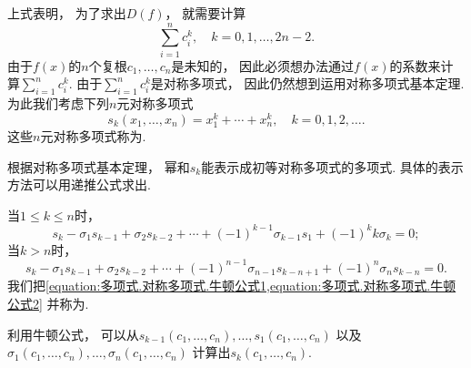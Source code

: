 上式表明，
为了求出\(D(f)\)，
就需要计算\[
	\sum_{i=1}^n c_i^k,
	\quad k=0,1,\dotsc,2n-2.
\]
由于\(f(x)\)的\(n\)个复根\(c_1,\dotsc,c_n\)是未知的，
因此必须想办法通过\(f(x)\)的系数来计算\(\sum_{i=1}^n c_i^k\).
由于\(\sum_{i=1}^n c_i^k\)是对称多项式，
因此仍然想到运用对称多项式基本定理.
为此我们考虑下列\(n\)元对称多项式\[
	s_k(x_1,\dotsc,x_n)
	=x_1^k+\dotsb+x_n^k,
	\quad k=0,1,2,\dotsc.
\]
这些\(n\)元对称多项式称为.

根据对称多项式基本定理，
幂和\(s_k\)能表示成初等对称多项式的多项式.
具体的表示方法可以用递推公式求出.

当\(1\leq k\leq n\)时，
\begin{equation}\label{equation:多项式.对称多项式.牛顿公式1}
	s_k
	- \sigma_1 s_{k-1}
	+ \sigma_2 s_{k-2}
	+ \dotsb
	+ (-1)^{k-1} \sigma_{k-1} s_1
	+ (-1)^k k \sigma_k
	=0;
\end{equation}
当\(k>n\)时，
\begin{equation}\label{equation:多项式.对称多项式.牛顿公式2}
	s_k
	- \sigma_1 s_{k-1}
	+ \sigma_2 s_{k-2}
	+ \dotsb
	+ (-1)^{n-1} \sigma_{n-1} s_{k-n+1}
	+ (-1)^n \sigma_n s_{k-n}
	=0.
\end{equation}
我们把\cref{equation:多项式.对称多项式.牛顿公式1,equation:多项式.对称多项式.牛顿公式2}
并称为.

利用牛顿公式，
可以从\(s_{k-1}(c_1,\dotsc,c_n),\dotsc,s_1(c_1,\dotsc,c_n)\)
以及\(\sigma_1(c_1,\dotsc,c_n),\dotsc,\sigma_n(c_1,\dotsc,c_n)\)
计算出\(s_k(c_1,\dotsc,c_n)\).
